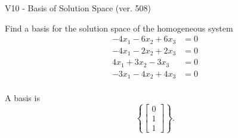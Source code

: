\begin{exercise}
  \begin{exerciseTitle}V10 - Basis of Solution Space (ver. 508)\end{exerciseTitle}
  \begin{exerciseStatement}
    Find a basis for the solution space of the homogeneous system 
\begin{align*}
 -4 x_ 1 -6 x_ 2 + 6 x_ 3 &= 0  \\ 
  -4 x_ 1 -2 x_ 2 + 2 x_ 3 &= 0  \\ 
  4 x_ 1 + 3 x_ 2 -3 x_ 3 &= 0  \\ 
  -3 x_ 1 -4 x_ 2 + 4 x_ 3 &= 0  \\ 
 \end{align*}


 
  \end{exerciseStatement}

  \begin{exerciseAnswer}
   A basis is   
\[\left\{\left[\begin{array}{c}
0 \\
1 \\
1
\end{array}\right]\right\}.\]

  


  \end{exerciseAnswer}
\end{exercise}